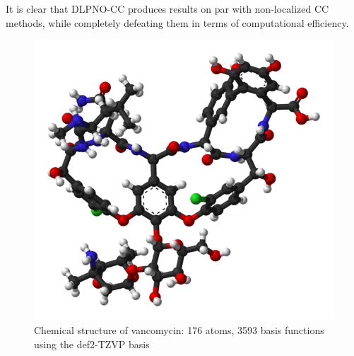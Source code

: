 \documentclass[letterpaper, 12pt]{article}
\begin{document}
It is clear that DLPNO-CC produces results on par with non-localized CC methods, while completely defeating them in terms of computational efficiency. 
\begin{figure}
\centering
\includegraphics[scale=0.35]{Images/Vanco.png}
\caption{Chemical structure of vancomycin: 176 atoms, 3593 basis functions using the def2-TZVP basis}
\label{vanco}
\end{figure}
\end{document}
